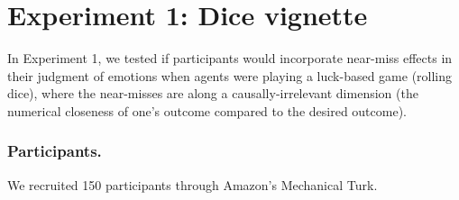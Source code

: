 \documentclass[10pt,letterpaper]{article}
\begin{document}
	

%
%
%
%












\section{Experiment 1: Dice vignette}

In Experiment 1, we tested if participants would incorporate near-miss effects in their judgment of emotions when agents were playing a luck-based game (rolling dice), where the near-misses are along a causally-irrelevant dimension (the numerical closeness of one's outcome compared to the desired outcome).

\subsubsection{Participants.} We recruited 150 participants through Amazon's Mechanical Turk.
\end{document}
